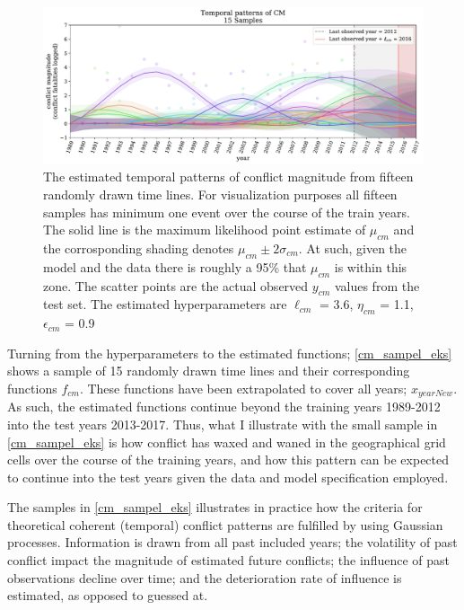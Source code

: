 \documentclass[a4paper]{article}
\begin{document}
\begin{figure}[!htb]
	\centering
	\includegraphics[scale=0.47]{cm_15_samples.pdf}
    \caption{\footnotesize{The estimated temporal patterns of conflict magnitude from fifteen randomly drawn time lines. For visualization purposes all fifteen samples has minimum one event over the course of the train years. The solid line is the maximum likelihood point estimate of $\mu_{cm}$ and the corrosponding shading denotes $\mu_{cm} \pm 2\sigma_{cm}$. At such, given the model and the data there is roughly a 95\% that $\mu_{cm}$ is within this zone. The scatter points are the actual observed $y_{cm}$ values from the test set. The estimated hyperparameters are $\ell_{cm}$ = 3.6, $\eta_{cm}$ = 1.1, $\epsilon_{cm}$ = 0.9}\label{cm_sampel_eks}}
\end{figure}

Turning from the hyperparameters to the estimated functions; \autoref{cm_sampel_eks} shows a sample of 15 randomly drawn time lines and their corresponding functions $f_{cm}$. These functions have been extrapolated to cover all years; $x_{yearNew}$. As such, the estimated functions continue beyond the training years 1989-2012 into the test years 2013-2017. Thus, what I illustrate with the small sample in \autoref{cm_sampel_eks} is how conflict has waxed and waned in the geographical grid cells over the course of the training years, and how this pattern can be expected to continue into the test years given the data and model specification employed.\par 

The samples in \autoref{cm_sampel_eks} illustrates in practice how the criteria for theoretical coherent (temporal) conflict patterns are fulfilled by using Gaussian processes. Information is drawn from all past included years; the volatility of past conflict impact the magnitude of estimated future conflicts; the influence of past observations decline over time; and the deterioration rate of influence is estimated, as opposed to guessed at.\par
\end{document}
